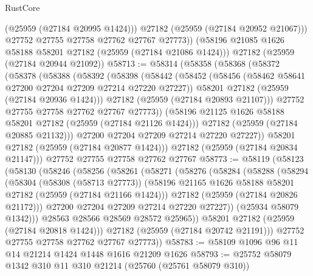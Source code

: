 \begin{lexlean}{RustCore}
\begin{coremodule}
            (@25959 (@27184 @20995 @1424)))
          @27182
          (@25959 (@27184 @20952 @21067)))
        @27752
        @27755
        @27758
        @27762
        @27767
        @27773))
    (@58196 @21085 @1626 @58188 @58201 @27182 (@25959 (@27184 @21086 @1424)))
    @27182
    (@25959 (@27184 @20944 @21092))
@58713 := @58314
    (@58358
      (@58368
        (@58372
          (@58378
            (@58388
              (@58392
                (@58398
                  (@58442
                    (@58452
                      (@58456 (@58462 @58641 @27200 @27204 @27209 @27214 @27220 @27227))
                      @58201
                      @27182
                      (@25959 (@27184 @20936 @1424)))
                    @27182
                    (@25959 (@27184 @20893 @21107)))
                  @27752
                  @27755
                  @27758
                  @27762
                  @27767
                  @27773))
              (@58196 @21125 @1626 @58188 @58201 @27182 (@25959 (@27184 @21126 @1424)))
              @27182
              (@25959 (@27184 @20885 @21132)))
            @27200
            @27204
            @27209
            @27214
            @27220
            @27227))
        @58201
        @27182
        (@25959 (@27184 @20877 @1424)))
      @27182
      (@25959 (@27184 @20834 @21147)))
    @27752
    @27755
    @27758
    @27762
    @27767
@58773 := @58119
    (@58123
      (@58130
        (@58246
          (@58256
            (@58261
              (@58271
                (@58276
                  (@58284
                    (@58288
                      (@58294
                        (@58304
                          (@58308 (@58713 @27773))
                          (@58196 @21165 @1626 @58188 @58201 @27182 (@25959 (@27184 @21166 @1424)))
                          @27182
                          (@25959 (@27184 @20826 @21172)))
                        @27200
                        @27204
                        @27209
                        @27214
                        @27220
                        @27227))
                    (@25934 @58079 @1342)))
                @28563
                @28566
                @28569
                @28572
                @25965))
            @58201
            @27182
            (@25959 (@27184 @20818 @1424)))
          @27182
          (@25959 (@27184 @20742 @21191)))
        @27752
        @27755
        @27758
        @27762
        @27767
        @27773))
@58783 := @58109 @1096 @96 @11 @14 @21214 @1424 @1448 @1616 @21209 @1626
@58793 := @25752 @58079 @1342 @310 @11 @310 @21214 (@25760 (@25761 @58079 @310))

\end{coremodule}
\end{lexlean}
